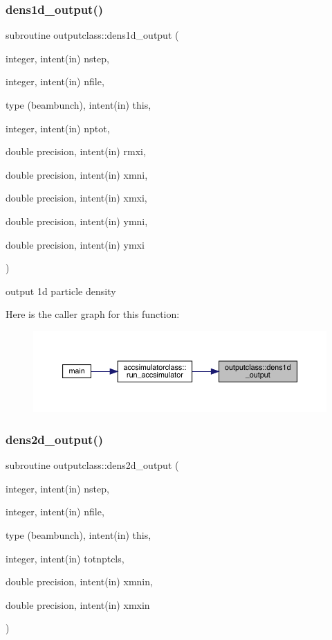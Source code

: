 \subsubsection{\texorpdfstring{dens1d\_output()}{dens1d\_output()}}
{\footnotesize\ttfamily subroutine outputclass\+::dens1d\+\_\+output (\begin{DoxyParamCaption}\item[{integer, intent(in)}]{nstep,  }\item[{integer, intent(in)}]{nfile,  }\item[{type (beambunch), intent(in)}]{this,  }\item[{integer, intent(in)}]{nptot,  }\item[{double precision, intent(in)}]{rmxi,  }\item[{double precision, intent(in)}]{xmni,  }\item[{double precision, intent(in)}]{xmxi,  }\item[{double precision, intent(in)}]{ymni,  }\item[{double precision, intent(in)}]{ymxi }\end{DoxyParamCaption})}



output 1d particle density 

Here is the caller graph for this function\+:\nopagebreak
\begin{figure}[H]
\begin{center}
\leavevmode
\includegraphics[width=350pt]{namespaceoutputclass_acc8a8c481be8eb7a7ebb49852db14185_icgraph}
\end{center}
\end{figure}
\mbox{\label{namespaceoutputclass_ab7f55098e75e7410bbbb6ffa50148508}} 
\subsubsection{\texorpdfstring{dens2d\_output()}{dens2d\_output()}}
{\footnotesize\ttfamily subroutine outputclass\+::dens2d\+\_\+output (\begin{DoxyParamCaption}\item[{integer, intent(in)}]{nstep,  }\item[{integer, intent(in)}]{nfile,  }\item[{type (beambunch), intent(in)}]{this,  }\item[{integer, intent(in)}]{totnptcls,  }\item[{double precision, intent(in)}]{xmnin,  }\item[{double precision, intent(in)}]{xmxin }\end{DoxyParamCaption})}




